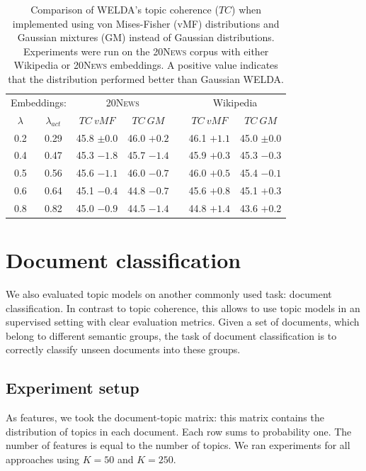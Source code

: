 \documentclass[
        a4paper,
        titlepage,
        twoside,
        parskip,
        numbers=noenddot
        ]{scrbook}
\newcommand{\ra}[1]{\renewcommand{\arraystretch}{#1}}
\theoremstyle{break}
\begin{document}
\begin{table}[]
  \ra{1.3}
  \centering
  \caption{Comparison of WELDA's topic coherence ($TC$) when implemented using von Mises-Fisher (vMF) distributions and Gaussian mixtures (GM) instead of Gaussian distributions.
  Experiments were run on the \textsc{20News} corpus with either Wikipedia or \textsc{20News} embeddings. 
  A positive value indicates that the distribution performed better than Gaussian WELDA.}
  \label{table:welda_other_distributions}
  \begin{tabular}{@{}ccccccc@{}}
    \toprule
    \multicolumn{2}{r}{Embeddings:} & \multicolumn{2}{c}{\textsc{20News}} && \multicolumn{2}{c}{Wikipedia} \\
    \cmidrule{3-4} \cmidrule{6-7}
    $\lambda$ & $\lambda_{act}$     & $TC~vMF$        & $TC~GM$           && $TC~vMF$       & $TC~GM$      \\
    \midrule
    0.2       & 0.29                & 45.8 $\pm 0.0$  & 46.0 $+0.2$       && 46.1   $+1.1$  & 45.0 $\pm 0.0$ \\
    0.4       & 0.47                & 45.3 $-1.8$     & 45.7 $-1.4$       && 45.9   $+0.3$  & 45.3 $-0.3$     \\
    0.5       & 0.56                & 45.6 $-1.1$     & 46.0 $-0.7$       && 46.0   $+0.5$  & 45.4 $-0.1$     \\
    0.6       & 0.64                & 45.1 $-0.4$     & 44.8 $-0.7$       && 45.6   $+0.8$  & 45.1 $+0.3$     \\
    0.8       & 0.82                & 45.0 $-0.9$     & 44.5 $-1.4$       && 44.8   $+1.4$  & 43.6 $+0.2$     \\ \bottomrule
  \end{tabular}
\end{table}


\section{Document classification}
We also evaluated topic models on another commonly used task: document classification.
In contrast to topic coherence, this allows to use topic models in an supervised setting with clear evaluation metrics.
Given a set of documents, which belong to different semantic groups, the task of document classification is to correctly classify unseen documents into these groups.

\subsection{Experiment setup}
\label{sec:dc_setup}
As features, we took the document-topic matrix: this matrix contains the distribution of topics in each document.
Each row sums to probability one.
The number of features is equal to the number of topics.
We ran experiments for all approaches using $K = 50$ and $K = 250$.
\end{document}
